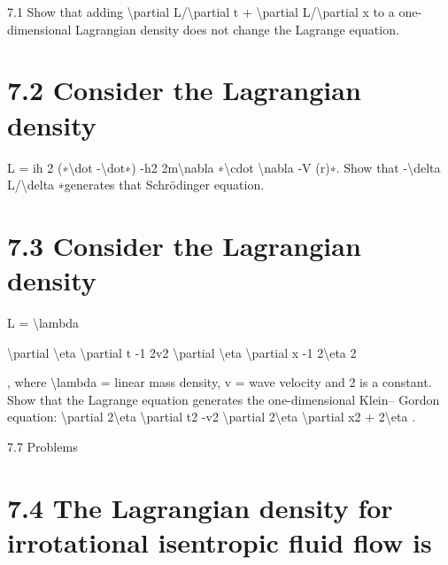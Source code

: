 7.1 Show that adding \textbackslash{}partial L/\textbackslash{}partial t + \textbackslash{}partial L/\textbackslash{}partial x to a one-dimensional Lagrangian density does not change the Lagrange equation.
\section*{7.2  Consider the Lagrangian density}

L = ih
2 (∗\textbackslash{}dot -\textbackslash{}dot∗) -h2
2m\textbackslash{}nabla ∗\textbackslash{}cdot  \textbackslash{}nabla  -V (r)∗.
Show that -\textbackslash{}delta L/\textbackslash{}delta ∗generates that Schrödinger equation.
\section*{7.3  Consider the Lagrangian density}

L = \textbackslash{}lambda

\textbackslash{}partial \textbackslash{}eta
\textbackslash{}partial t
-1
2v2
\textbackslash{}partial \textbackslash{}eta
\textbackslash{}partial x
-1
2\textbackslash{}eta 2

,
where \textbackslash{}lambda  = linear mass density, v = wave velocity and 2 is a constant.
Show that the Lagrange equation generates the one-dimensional Klein--
Gordon equation:
\textbackslash{}partial 2\textbackslash{}eta
\textbackslash{}partial t2 -v2 \textbackslash{}partial 2\textbackslash{}eta
\textbackslash{}partial x2 + 2\textbackslash{}eta .

7.7
Problems
\section*{7.4  The Lagrangian density for irrotational isentropic fluid flow is}

